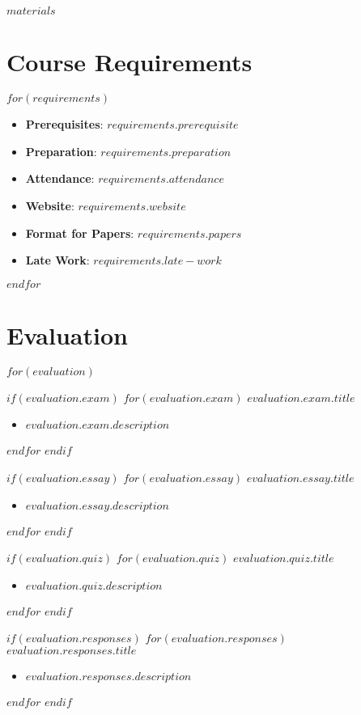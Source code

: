 \documentclass[$fontsize$, letterpaper]{article}
\begin{document}
$materials$

\section*{Course Requirements}
$for(requirements)$
\begin{itemize}[leftmargin=*]
\item \textbf{Prerequisites}: $requirements.prerequisite$
\item \textbf{Preparation}: $requirements.preparation$
\item \textbf{Attendance}: $requirements.attendance$
\item \textbf{Website}: $requirements.website$
\item \textbf{Format for Papers}: $requirements.papers$
\item \textbf{Late Work}: $requirements.late-work$
\end{itemize}
$endfor$

\section*{Evaluation}

$for(evaluation)$

$if(evaluation.exam)$
  $for(evaluation.exam)$ 
    \textbf{$evaluation.exam.title$}
    \begin{itemize}[leftmargin=*]
    \item $evaluation.exam.description$ 
    \end{itemize}
  $endfor$
$endif$

$if(evaluation.essay)$
  $for(evaluation.essay)$ 
    \textbf{$evaluation.essay.title$}
    \begin{itemize}[leftmargin=*]
    \item $evaluation.essay.description$ 
    \end{itemize}
  $endfor$
$endif$

$if(evaluation.quiz)$
  $for(evaluation.quiz)$ 
    \textbf{$evaluation.quiz.title$}
    \begin{itemize}[leftmargin=*]
    \item $evaluation.quiz.description$ 
    \end{itemize}
  $endfor$
$endif$

$if(evaluation.responses)$
  $for(evaluation.responses)$ 
    \textbf{$evaluation.responses.title$}
    \begin{itemize}[leftmargin=*]
    \item $evaluation.responses.description$ 
    \end{itemize}
  $endfor$
$endif$
\end{document}
